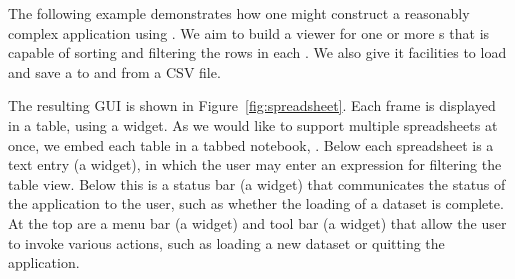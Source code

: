 \documentclass[article,shortnames]{jss}
\begin{document}
The following example demonstrates how one might construct a
reasonably complex
application using . We aim to build a viewer for one or
more  s that is capable of sorting and
filtering the
rows in each . We also give it facilities to load and
save a  to and from a CSV file. 

The resulting GUI is shown in Figure~\ref{fig:spreadsheet}. Each
 frame is displayed in a table, using a
 widget. As we would like to support multiple
spreadsheets at once, we embed each table in a tabbed notebook,
. Below each spreadsheet is a text entry (a
 widget), in which the user may enter an expression for
filtering the table view. Below this is a status bar (a
 widget) that communicates the status
of the application to the user, such as whether the loading of a
dataset is complete. At the top are a menu bar (a 
widget) and tool bar (a  widget) that allow the user
to invoke various actions, such as loading a new dataset or quitting
the application.



%



\end{document}
